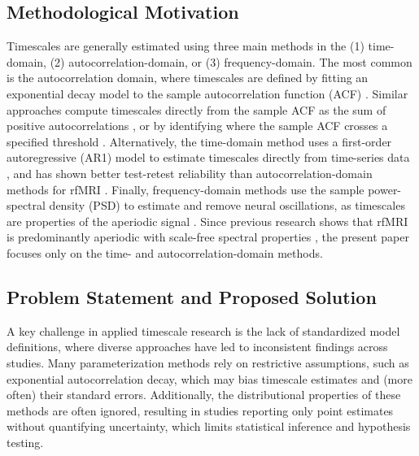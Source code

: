 \documentclass[latex/main.tex]{subfiles}
\begin{document}
\subsection{Methodological Motivation}
Timescales are generally estimated using three main methods in the (1) time-domain, (2) autocorrelation-domain, or (3) frequency-domain. The most common is the autocorrelation domain, where timescales are defined by fitting an exponential decay model to the sample autocorrelation function (ACF) \citep{rossi-pool_invariant_2021, cirillo_neural_2018, ito_cortical_2020, runyan_distinct_2017, zeraati_flexible_2022, nougaret_intrinsic_2021, wasmuht_intrinsic_2018, muller_core_2020, maisson_choice-relevant_2021, li_hierarchical_2022, shafiei_topographic_2020}. Similar approaches compute timescales directly from the sample ACF as the sum of positive autocorrelations \citep{wengler_distinct_2020, manea_intrinsic_2022, watanabe_atypical_2019}, or by identifying where the sample ACF crosses a specified threshold \citep{wengler_distinct_2020, zilio_are_2021}. Alternatively, the time-domain method uses a first-order autoregressive (AR1) model to estimate timescales directly from time-series data \citep{kaneoke_variance_2012, meisel_decline_2017, huang_timescales_2018, lurie_cortical_2024, shinn_functional_2023, shafiei_topographic_2020}, and has shown better test-retest reliability than autocorrelation-domain methods for rfMRI \citep{huang_timescales_2018}. Finally, frequency-domain methods use the sample power-spectral density (PSD) to estimate and remove neural oscillations, as timescales are properties of the aperiodic signal \citep{donoghue_parameterizing_2020, gao_neuronal_2020, manea_neural_2024, zeraati_flexible_2022, fallon_timescales_2020}. Since previous research shows that rfMRI is predominantly aperiodic with scale-free spectral properties \citep{he_temporal_2010, he_scale-free_2011}, the present paper focuses only on the time- and autocorrelation-domain methods.

\subsection{Problem Statement and Proposed Solution}
A key challenge in applied timescale research is the lack of standardized model definitions, where diverse approaches have led to inconsistent findings across studies. Many parameterization methods rely on restrictive assumptions, such as exponential autocorrelation decay, which may bias timescale estimates and (more often) their standard errors. Additionally, the distributional properties of these methods are often ignored, resulting in studies reporting only point estimates without quantifying uncertainty, which limits statistical inference and hypothesis testing.\\
\end{document}
